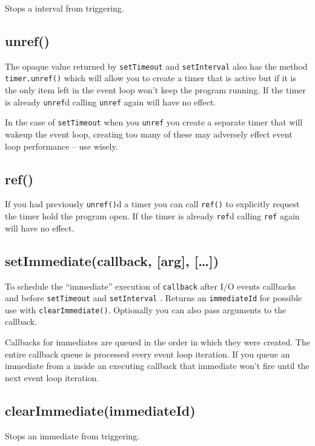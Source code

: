 Stops a interval from triggering.

\subsection{unref()}

The opaque value returned by \texttt{setTimeout} and
\texttt{setInterval} also has the method \texttt{timer.unref()} which
will allow you to create a timer that is active but if it is the only
item left in the event loop won't keep the program running. If the timer
is already \texttt{unref}d calling \texttt{unref} again will have no
effect.

In the case of \texttt{setTimeout} when you \texttt{unref} you create a
separate timer that will wakeup the event loop, creating too many of
these may adversely effect event loop performance -- use wisely.

\subsection{ref()}

If you had previously \texttt{unref()}d a timer you can call
\texttt{ref()} to explicitly request the timer hold the program open. If
the timer is already \texttt{ref}d calling \texttt{ref} again will have
no effect.

\subsection{setImmediate(callback, {[}arg{]}, {[}\ldots{}{]})}

To schedule the ``immediate'' execution of \texttt{callback} after I/O
events callbacks and before \texttt{setTimeout} and \texttt{setInterval}
. Returns an \texttt{immediateId} for possible use with
\texttt{clearImmediate()}. Optionally you can also pass arguments to the
callback.

Callbacks for immediates are queued in the order in which they were
created. The entire callback queue is processed every event loop
iteration. If you queue an immediate from a inside an executing callback
that immediate won't fire until the next event loop iteration.

\subsection{clearImmediate(immediateId)}

Stops an immediate from triggering.
